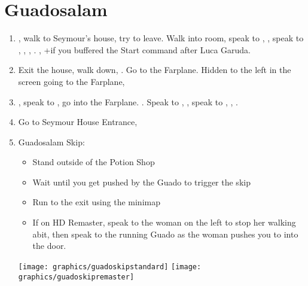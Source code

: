 \chapter{Guadosalam}

\begin{enumerate}
    \item \sd, walk to Seymour's house, try to leave. Walk into room, speak to \auron, \sd, speak to \wakka, \lulu, \rikku, \yuna. \sd, \skippablefmv+\cs[5:50] if you buffered the Start command after Luca Garuda.
    \item Exit the house, walk down, \sd. Go to the Farplane. Hidden to the left in the screen going to the Farplane, 
    \item \sd, speak to \auron, go into the Farplane. \cs[1:20]. Speak to \wakka, \sd, speak to \yuna, \cs[2:10], \sd.
    \item Go to Seymour House Entrance, \sd
    \wincb\losscb\bothcb
    \item Guadosalam Skip:
    \begin{itemize}
        \item Stand outside of the Potion Shop
        \item Wait until you get pushed by the Guado to trigger the skip
        \item Run to the exit using the minimap
        \item If on HD Remaster, speak to the woman on the left to stop her walking abit, then speak to the running Guado as the woman pushes you to into the door.
    \end{itemize}
    \texttt{[image: graphics/guadoskipstandard]}
    \texttt{[image: graphics/guadoskipremaster]}
\end{enumerate}
